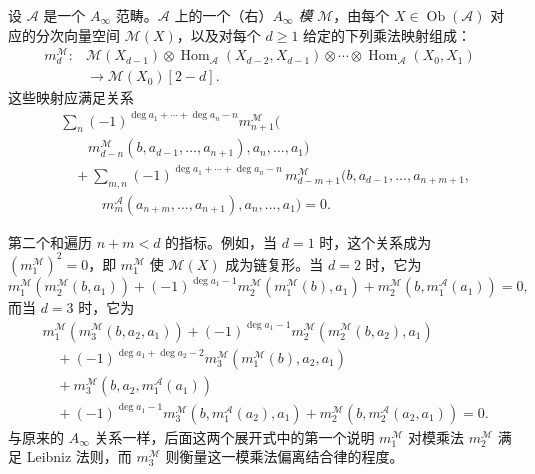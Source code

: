 \begin{definition}\label{def:8.14}
设 $\mathcal A$ 是一个 $A_\infty$ 范畴。$\mathcal A$ 上的一个（右）\emph{$A_\infty$ 模} $\mathcal M$，由每个 $X\in\operatorname{Ob}(\mathcal A)$ 对应的分次向量空间 $\mathcal M(X)$，以及对每个 $d\geq1$ 给定的下列乘法映射组成：
\setcounter{equation}{8}
\begin{equation}\label{eq:8.9}
\begin{aligned}
m_d^{\mathcal M}\colon{}&\mathcal M(X_{d-1})\otimes
\operatorname{Hom}_{\mathcal A}(X_{d-2},X_{d-1})\otimes\cdots
\otimes\operatorname{Hom}_{\mathcal A}(X_0,X_1)\\
&\longrightarrow\mathcal M(X_0)[2-d].
\end{aligned}
\end{equation}
这些映射应满足关系
\[
\begin{aligned}
&\sum_n(-1)^{\deg a_1+\cdots+\deg a_n-n}
m_{n+1}^{\mathcal M}\bigl(\\
&\qquad m_{d-n}^{\mathcal M}(b,a_{d-1},\ldots,a_{n+1}),a_n,\ldots,a_1\bigr)\\
&\quad+\sum_{m,n}(-1)^{\deg a_1+\cdots+\deg a_n-n}\,
m_{d-m+1}^{\mathcal M}\bigl(b,a_{d-1},\ldots,a_{n+m+1},\\
&\qquad\quad m_m^{\mathcal A}(a_{n+m},\ldots,a_{n+1}),a_n,\ldots,a_1\bigr)=0.
\end{aligned}
\]

第二个和遍历 $n+m<d$ 的指标。例如，当 $d=1$ 时，这个关系成为 $(m_1^{\mathcal M})^2=0$，即 $m_1^{\mathcal M}$ 使 $\mathcal M(X)$ 成为链复形。当 $d=2$ 时，它为
\[
m_1^{\mathcal M}(m_2^{\mathcal M}(b,a_1))
+(-1)^{\deg a_1-1}m_2^{\mathcal M}(m_1^{\mathcal M}(b),a_1)
+m_2^{\mathcal M}(b,m_1^{\mathcal A}(a_1))=0,
\]
而当 $d=3$ 时，它为
\[
\begin{aligned}
&m_1^{\mathcal M}(m_3^{\mathcal M}(b,a_2,a_1))
+(-1)^{\deg a_1-1}m_2^{\mathcal M}(m_2^{\mathcal M}(b,a_2),a_1)\\
&\quad+(-1)^{\deg a_1+\deg a_2-2}
m_3^{\mathcal M}(m_1^{\mathcal M}(b),a_2,a_1)\\
&\quad+m_3^{\mathcal M}(b,a_2,m_1^{\mathcal A}(a_1))\\
&\quad+(-1)^{\deg a_1-1}m_3^{\mathcal M}(b,m_1^{\mathcal A}(a_2),a_1)
+m_2^{\mathcal M}(b,m_2^{\mathcal A}(a_2,a_1))=0.
\end{aligned}
\]
与原来的 $A_\infty$ 关系一样，后面这两个展开式中的第一个说明 $m_1^{\mathcal M}$ 对模乘法 $m_2^{\mathcal M}$ 满足 Leibniz 法则，而 $m_3^{\mathcal M}$ 则衡量这一模乘法偏离结合律的程度。
\end{definition}

